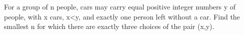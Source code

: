 For a group of n people, cars may carry equal positive integer numbers y of people, with x cars, x<y, and exactly one person left without a car. Find the smallest n for which there are exactly three choices of the pair (x,y).
